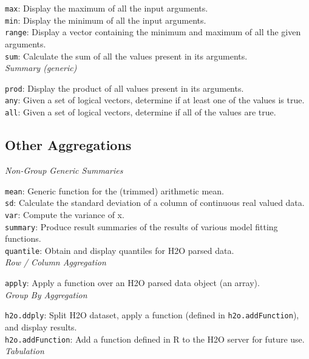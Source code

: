 \documentclass[11pt]{article}
\begin{document}
\begin{enumerate}
{{\texttt{max}}: Display the maximum of all the input arguments. \\
{\texttt{min}}: Display the minimum of all the input arguments. \\
{\texttt{range}}: Display a vector containing the minimum and maximum of all the given arguments. \\
{\texttt{sum}}: Calculate the sum of all the values present in its arguments.\\

\textit{Summary (generic)}

{\texttt{prod}}: Display the product of all values present in its arguments. \\
{\texttt{any}}: Given a set of logical vectors, determine if at least one of the values is true. \\
{\texttt{all}}: Given a set of logical vectors, determine if all of the values are true.\\

\subsection{Other Aggregations}

\textit{Non-Group Generic Summaries}

{\texttt{mean}}: Generic function for the (trimmed) arithmetic mean. \\
{\texttt{sd}}: Calculate the standard deviation of a column of continuous real valued data. \\
{\texttt{var}}: Compute the variance of x.\\
{\texttt{summary}}: Produce result summaries of the results of various model fitting functions. \\
{\texttt{quantile}}: Obtain and display quantiles for H2O parsed data.\\

\textit{Row / Column Aggregation}

{\texttt{apply}: Apply a function over an H2O parsed data object (an array).\\

\textit{Group By Aggregation}

{\texttt{h2o.ddply}}: Split H2O dataset, apply a function (defined in {\texttt{h2o.addFunction}}), and display results.\\
{\texttt{h2o.addFunction}}: Add a function defined in R to the H2O server for future use. \\

\textit{Tabulation}

}}
\end{enumerate}
\end{document}

